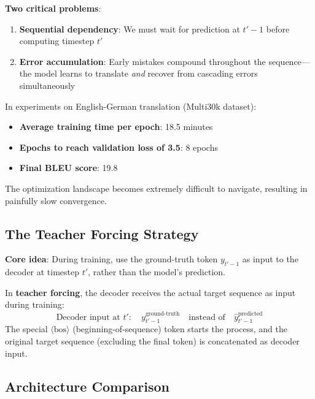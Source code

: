 \documentclass{article}
\begin{document}
\textbf{Two critical problems}:
\begin{enumerate}
\item \textbf{Sequential dependency}: We must wait for prediction at $t'-1$ before computing timestep $t'$
\item \textbf{Error accumulation}: Early mistakes compound throughout the sequence—the model learns to translate \textit{and} recover from cascading errors simultaneously
\end{enumerate}

\begin{tcolorbox}[colback=red!5!white, colframe=red!50!black, title=Empirical Impact of Free-Running Training]
In experiments on English-German translation (Multi30k dataset):
\begin{itemize}
\item \textbf{Average training time per epoch}: 18.5 minutes
\item \textbf{Epochs to reach validation loss of 3.5}: 8 epochs
\item \textbf{Final BLEU score}: 19.8

\end{itemize}
The optimization landscape becomes extremely difficult to navigate, resulting in painfully slow convergence.
\end{tcolorbox}

\subsection{The Teacher Forcing Strategy}

\textbf{Core idea}: During training, use the ground-truth token $y_{t'-1}$ as input to the decoder at timestep $t'$, rather than the model's prediction.

\begin{tcolorbox}[colback=blue!5!white, colframe=blue!50!black, title=Teacher Forcing Definition]
In \textbf{teacher forcing}, the decoder receives the actual target sequence as input during training:
\[
\text{Decoder input at } t': \quad y_{t'-1}^{\text{ground-truth}} \quad \text{instead of} \quad \hat{y}_{t'-1}^{\text{predicted}}
\]
The special $\langle \text{bos} \rangle$ (beginning-of-sequence) token starts the process, and the original target sequence (excluding the final token) is concatenated as decoder input.
\end{tcolorbox}

\subsection{Architecture Comparison}
\end{document}
